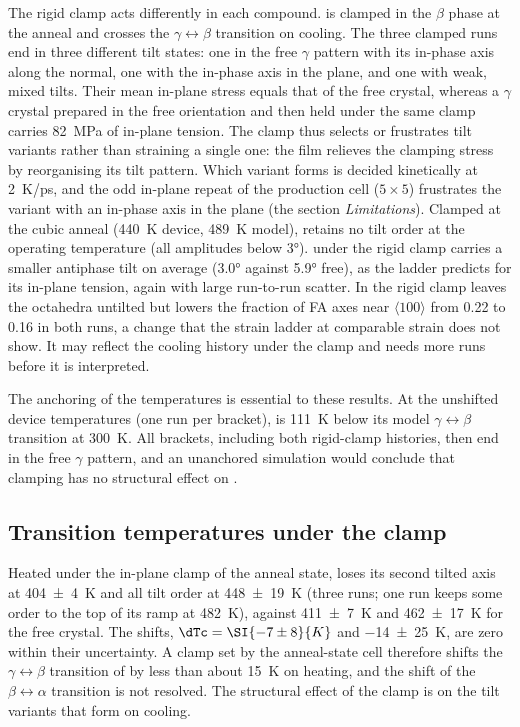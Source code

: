 The rigid clamp acts differently in each compound. \CsSnI{} is clamped in the $\beta$
phase at the anneal and crosses the $\gamma\leftrightarrow\beta$ transition on cooling. The
three clamped runs end in three different tilt states: one in the free $\gamma$ pattern with
its in-phase axis along the normal, one with the in-phase axis in the plane, and one with
weak, mixed tilts. Their mean in-plane stress equals that of the free crystal, whereas a
$\gamma$ crystal prepared in the free orientation and then held under the same clamp
carries \SI{82}{MPa} of in-plane tension. The clamp thus selects or frustrates tilt
variants rather than straining a single one: the film relieves the clamping stress by
reorganising its tilt pattern. Which variant forms is decided kinetically at \SI{2}{K/ps},
and the odd in-plane repeat of the production cell ($5\times5$) frustrates the variant with
an in-phase axis in the plane (the section \emph{Limitations}). Clamped at the cubic anneal
(\SI{440}{K} device, \SI{489}{K} model), \CsSnI{} retains no tilt order at the operating
temperature (all amplitudes below \ang{3}). \MASnI{} under the rigid clamp carries a smaller
antiphase tilt on average (\ang{3.0} against \ang{5.9} free), as the ladder predicts for its
in-plane tension, again with large run-to-run scatter. In \FASnI{} the rigid clamp leaves the octahedra untilted but lowers
the fraction of FA axes near $\langle100\rangle$ from 0.22 to 0.16 in both runs, a change
that the strain ladder at comparable strain does not show. It may reflect the cooling
history under the clamp and needs more runs before it is interpreted.

The anchoring of the temperatures is essential to these results. At the unshifted device
temperatures (one run per bracket), \CsSnI{} is \SI{111}{K} below its model
$\gamma\leftrightarrow\beta$ transition at \SI{300}{K}. All brackets, including both
rigid-clamp histories, then end in the free $\gamma$ pattern, and an unanchored simulation
would conclude that clamping has no structural effect on \CsSnI{}.

\subsection{Transition temperatures under the clamp}
\label{sec:res-dtc}

Heated under the in-plane clamp of the anneal state, \CsSnI{} loses its second tilted axis
at \SI{404 \pm 4}{K} and all tilt order at \SI{448 \pm 19}{K} (three runs; one run keeps
some order to the top of its ramp at \SI{482}{K}), against \SI{411 \pm 7}{K} and
\SI{462 \pm 17}{K} for the free crystal. The shifts, $\dTc = \SI{-7 \pm 8}{K}$ and
\SI{-14 \pm 25}{K}, are zero within their uncertainty. A clamp set by the anneal-state
cell therefore shifts the $\gamma\leftrightarrow\beta$ transition of \CsSnI{} by less than
about \SI{15}{K} on heating, and the shift of the $\beta\leftrightarrow\alpha$ transition is
not resolved. The structural effect of the clamp is on the tilt variants that form on
cooling.

